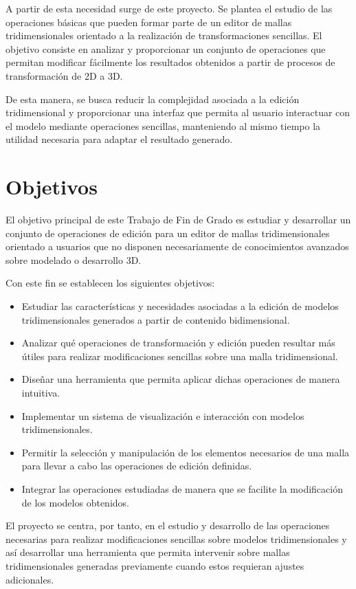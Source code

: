 A partir de esta necesidad surge de este proyecto. Se plantea el estudio de las operaciones básicas que pueden formar parte de un editor de mallas tridimensionales orientado a la realización de transformaciones sencillas. El objetivo consiste en analizar y proporcionar un conjunto de operaciones que permitan modificar fácilmente los resultados obtenidos a partir de procesos de transformación de 2D a 3D.

De esta manera, se busca reducir la complejidad asociada a la edición tridimensional y proporcionar una interfaz que permita al usuario interactuar con el modelo mediante operaciones sencillas, manteniendo al mismo tiempo la utilidad necesaria para adaptar el resultado generado.


\section{Objetivos} \label{sec:objetivos}

El objetivo principal de este Trabajo de Fin de Grado es estudiar y desarrollar un conjunto de operaciones de edición para un editor de mallas tridimensionales orientado a usuarios que no disponen necesariamente de conocimientos avanzados sobre modelado o desarrollo 3D.

Con este fin se establecen los siguientes objetivos:

\begin{itemize}
    \item Estudiar las características y necesidades asociadas a la edición de modelos tridimensionales generados a partir de contenido bidimensional.
    \item Analizar qué operaciones de transformación y edición pueden resultar más útiles para realizar modificaciones sencillas sobre una malla tridimensional.
    \item Diseñar una herramienta que permita aplicar dichas operaciones de manera intuitiva.
    \item Implementar un sistema de visualización e interacción con modelos tridimensionales.
    \item Permitir la selección y manipulación de los elementos necesarios de una malla para llevar a cabo las operaciones de edición definidas.
    \item Integrar las operaciones estudiadas de manera que se facilite la modificación de los modelos obtenidos.
\end{itemize}

El proyecto se centra, por tanto, en el estudio y desarrollo de las operaciones necesarias para realizar modificaciones sencillas sobre modelos tridimensionales y así desarrollar una herramienta que permita intervenir sobre mallas tridimensionales generadas previamente cuando estos requieran ajustes adicionales.

